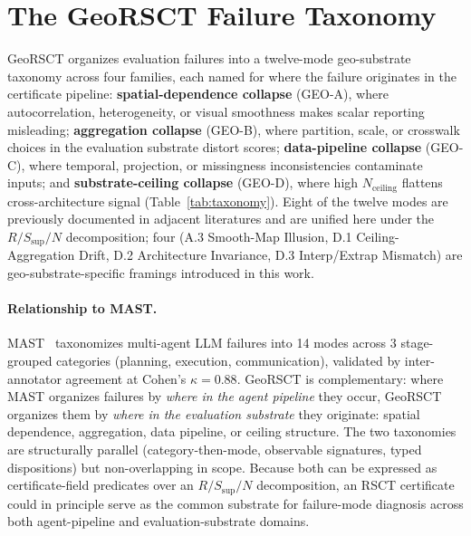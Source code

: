 \documentclass{article}
\begin{document}
\section{The GeoRSCT Failure Taxonomy}
\label{sec:taxonomy}

GeoRSCT organizes evaluation failures into a twelve-mode geo-substrate taxonomy across four families, each named for where the failure originates in the certificate pipeline: \textbf{spatial-dependence collapse} (GEO-A), where autocorrelation, heterogeneity, or visual smoothness makes scalar reporting misleading; \textbf{aggregation collapse} (GEO-B), where partition, scale, or crosswalk choices in the evaluation substrate distort scores; \textbf{data-pipeline collapse} (GEO-C), where temporal, projection, or missingness inconsistencies contaminate inputs; and \textbf{substrate-ceiling collapse} (GEO-D), where high $N_{\text{ceiling}}$ flattens cross-architecture signal (Table~\ref{tab:taxonomy}). Eight of the twelve modes are previously documented in adjacent literatures and are unified here under the $R/S_{\text{sup}}/N$ decomposition; four (A.3 Smooth-Map Illusion, D.1 Ceiling-Aggregation Drift, D.2 Architecture Invariance, D.3 Interp/Extrap Mismatch) are geo-substrate-specific framings introduced in this work.

\paragraph{Relationship to MAST.} MAST~\citep{cemri2025mast} taxonomizes multi-agent LLM failures into 14 modes across 3 stage-grouped categories (planning, execution, communication), validated by inter-annotator agreement at Cohen's $\kappa = 0.88$. GeoRSCT is complementary: where MAST organizes failures by \emph{where in the agent pipeline} they occur, GeoRSCT organizes them by \emph{where in the evaluation substrate} they originate: spatial dependence, aggregation, data pipeline, or ceiling structure. The two taxonomies are structurally parallel (category-then-mode, observable signatures, typed dispositions) but non-overlapping in scope. Because both can be expressed as certificate-field predicates over an $R/S_{\text{sup}}/N$ decomposition, an RSCT certificate could in principle serve as the common substrate for failure-mode diagnosis across both agent-pipeline and evaluation-substrate domains.
\end{document}
